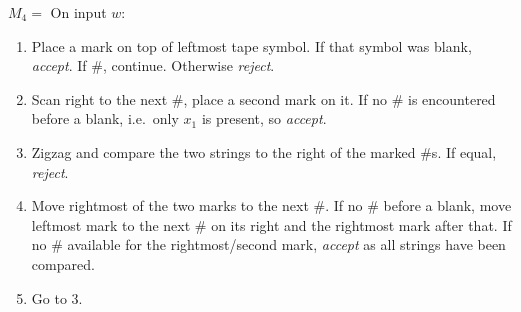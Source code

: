 \documentclass[12 pt]{article}
\begin{document}
$M_4 = $ On input $w$:
\begin{enumerate}
\item Place a mark on top of leftmost tape symbol. If that symbol was
  blank, \textit{accept}. If $\#$, continue. Otherwise
  \textit{reject}.
\item Scan right to the next $\#$, place a second mark on it. If no
  $\#$ is encountered before a blank, i.e.\ only $x_1$ is present, so
  \textit{accept}.
\item Zigzag and compare the two strings to the right of the marked
  $\#$s. If equal, \textit{reject}.
\item Move rightmost of the two marks to the next $\#$. If no $\#$
  before a blank, move leftmost mark to the next $\#$ on its right and
  the rightmost mark after that. If no $\#$ available for the
  rightmost/second mark, \textit{accept} as all strings have been
  compared.
\item Go to $3$.
\end{enumerate}
\end{document}
